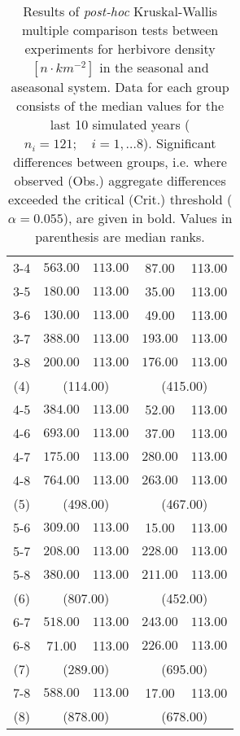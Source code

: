 \begin{table}[ht]
\begin{tabular*}{\textwidth}{@{\extracolsep{\fill} }ccccc}
   3-4 & \(\mathbf{563.00}\) & \(\mathbf{113.00}\) & 87.00 & 113.00 \\ 
  3-5 & \(\mathbf{180.00}\) & \(\mathbf{113.00}\) & 35.00 & 113.00 \\ 
  3-6 & \(\mathbf{130.00}\) & \(\mathbf{113.00}\) & 49.00 & 113.00 \\ 
  3-7 & \(\mathbf{388.00}\) & \(\mathbf{113.00}\) & \(\mathbf{193.00}\) & \(\mathbf{113.00}\) \\ 
  3-8 & \(\mathbf{200.00}\) & \(\mathbf{113.00}\) & \(\mathbf{176.00}\) & \(\mathbf{113.00}\) \\ 
   [1ex]
(4) & \multicolumn{2}{c}{(114.00)} & \multicolumn{2}{c}{(415.00)} \\   
   4-5 & \(\mathbf{384.00}\) & \(\mathbf{113.00}\) & 52.00 & 113.00 \\ 
  4-6 & \(\mathbf{693.00}\) & \(\mathbf{113.00}\) & 37.00 & 113.00 \\ 
  4-7 & \(\mathbf{175.00}\) & \(\mathbf{113.00}\) & \(\mathbf{280.00}\) & \(\mathbf{113.00}\) \\ 
  4-8 & \(\mathbf{764.00}\) & \(\mathbf{113.00}\) & \(\mathbf{263.00}\) & \(\mathbf{113.00}\) \\ 
   [1ex]
(5) & \multicolumn{2}{c}{(498.00)} & \multicolumn{2}{c}{(467.00)} \\   
   5-6 & \(\mathbf{309.00}\) & \(\mathbf{113.00}\) & 15.00 & 113.00 \\ 
  5-7 & \(\mathbf{208.00}\) & \(\mathbf{113.00}\) & \(\mathbf{228.00}\) & \(\mathbf{113.00}\) \\ 
  5-8 & \(\mathbf{380.00}\) & \(\mathbf{113.00}\) & \(\mathbf{211.00}\) & \(\mathbf{113.00}\) \\ 
   [1ex]
(6) & \multicolumn{2}{c}{(807.00)} & \multicolumn{2}{c}{(452.00)} \\    
   6-7 & \(\mathbf{518.00}\) & \(\mathbf{113.00}\) & \(\mathbf{243.00}\) & \(\mathbf{113.00}\) \\ 
  6-8 & 71.00 & 113.00 & \(\mathbf{226.00}\) & \(\mathbf{113.00}\) \\ 
   [1ex]
(7) & \multicolumn{2}{c}{(289.00)} & \multicolumn{2}{c}{(695.00)} \\   
   7-8 & \(\mathbf{588.00}\) & \(\mathbf{113.00}\) & 17.00 & 113.00 \\ 
   (8) & \multicolumn{2}{c}{(878.00)} & \multicolumn{2}{c}{(678.00)} \\
   \bottomrule
\end{tabular*}
\caption[Kruskal-Wallis multiple comparison of herbivore density.]{Results of \textit{post-hoc} Kruskal-Wallis multiple comparison
                            tests between experiments for herbivore density $[n\cdot km^{-2}]$ in the seasonal and aseasonal system.
                            Data for each group consists of the median values for the last 10 simulated years ($n_{i} = 121;\quad i = 1,\ldots8$).
                            Significant differences between groups, i.e. where observed (Obs.) aggregate differences exceeded the critical (Crit.) threshold ($\alpha = 0.055$), are given in bold. Values in parenthesis are median ranks.} 
\label{tab:chap:res:dyn:herbIND}
\end{table}
